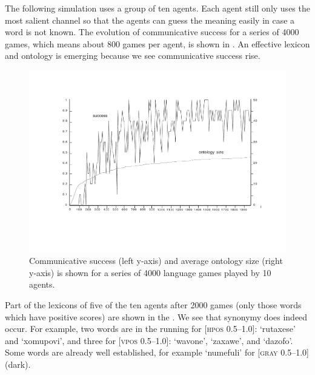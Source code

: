 The following simulation uses a group of ten agents. 
Each agent still only uses the most salient channel so that 
the agents can guess the meaning easily in case a word is not known. 
The evolution of communicative success for a series of 
4000 games, which means about 800 games per agent, 
is shown in . 
An effective lexicon and ontology is 
emerging because we see communicative success rise. 


\begin{figure}[htbp]
  \centerline{\includegraphics[width=\textwidth]{chap6/figs/gsucc2.pdf}}
\caption{\label{gsucc2}Communicative 
success (left y-axis) and average ontology size 
(right y-axis) is shown for a series of 4000
language games played by 10 agents.} 
\end{figure}

Part of the lexicons of five of the ten agents after 2000 games 
(only those words which have positive scores) are shown in the 
. We see that synonymy does indeed occur. For
example, two words are in the 
running for [\textsc{hpos} 0.5–1.0]: `rutaxese' and `xomupovi', and 
three for [\textsc{vpos} 0.5–1.0]: `wavone', `zaxawe', and 
`dazofo'. Some words are already well established, for
example `numefuli' for [\textsc{gray} 0.5–1.0] (dark). 


